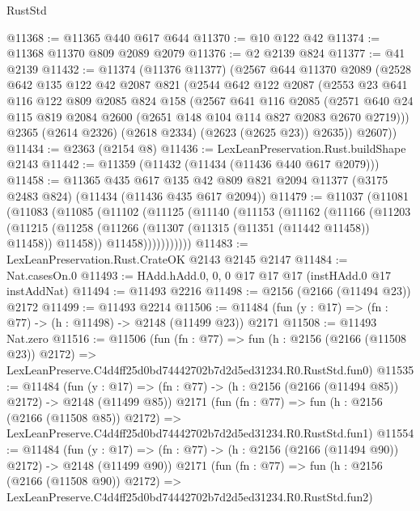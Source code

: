 \begin{lexlean}{RustStd}
\begin{coremodule}
@11368 := @11365 @440 @617 @644
@11370 := @10 @122 @42
@11374 := @11368 @11370 @809 @2089 @2079
@11376 := @2 @2139 @824
@11377 := @41 @2139
@11432 := @11374
    (@11376 @11377)
    (@2567
      @644
      @11370
      @2089
      (@2528
        @642
        @135
        @122
        @42
        @2087
        @821
        (@2544
          @642
          @122
          @2087
          (@2553
            @23
            @641
            @116
            @122
            @809
            @2085
            @824
            @158
            (@2567
              @641
              @116
              @2085
              (@2571 @640 @24 @115 @819 @2084 @2600 (@2651 @148 @104 @114 @827 @2083 @2670 @2719)))
            @2365
            (@2614 @2326)
            (@2618 @2334)
            (@2623 (@2625 @23))
            @2635))
        @2607))
@11434 := @2363 (@2154 @8)
@11436 := LexLeanPreservation.Rust.buildShape @2143
@11442 := @11359 (@11432 (@11434 (@11436 @440 @617 @2079)))
@11458 := @11365
    @435
    @617
    @135
    @42
    @809
    @821
    @2094
    @11377
    (@3175 @2483 @824)
    (@11434 (@11436 @435 @617 @2094))
@11479 := @11037
    (@11081
      (@11083
        (@11085
          (@11102
            (@11125
              (@11140
                (@11153
                  (@11162
                    (@11166
                      (@11203
                        (@11215
                          (@11258 (@11266 (@11307 (@11315 (@11351 (@11442 @11458)) @11458)) @11458))
                          @11458)))))))))))
@11483 := LexLeanPreservation.Rust.CrateOK @2143 @2145 @2147
@11484 := Nat.casesOn.{0}
@11493 := HAdd.hAdd.{0, 0, 0} @17 @17 @17 (instHAdd.{0} @17 instAddNat)
@11494 := @11493 @2216
@11498 := @2156 (@2166 (@11494 @23)) @2172
@11499 := @11493 @2214
@11506 := @11484 (fun (y : @17) => (fn : @77) -> (h : @11498) -> @2148 (@11499 @23)) @2171
@11508 := @11493 Nat.zero
@11516 := @11506
    (fun (fn : @77) =>
    fun (h : @2156 (@2166 (@11508 @23)) @2172) =>
    LexLeanPreserve.C4d4ff25d0bd74442702b7d2d5ed31234.R0.RustStd.fun0)
@11535 := @11484
    (fun (y : @17) => (fn : @77) -> (h : @2156 (@2166 (@11494 @85)) @2172) -> @2148 (@11499 @85))
    @2171
    (fun (fn : @77) =>
    fun (h : @2156 (@2166 (@11508 @85)) @2172) =>
    LexLeanPreserve.C4d4ff25d0bd74442702b7d2d5ed31234.R0.RustStd.fun1)
@11554 := @11484
    (fun (y : @17) => (fn : @77) -> (h : @2156 (@2166 (@11494 @90)) @2172) -> @2148 (@11499 @90))
    @2171
    (fun (fn : @77) =>
    fun (h : @2156 (@2166 (@11508 @90)) @2172) =>
    LexLeanPreserve.C4d4ff25d0bd74442702b7d2d5ed31234.R0.RustStd.fun2)

\end{coremodule}
\end{lexlean}
